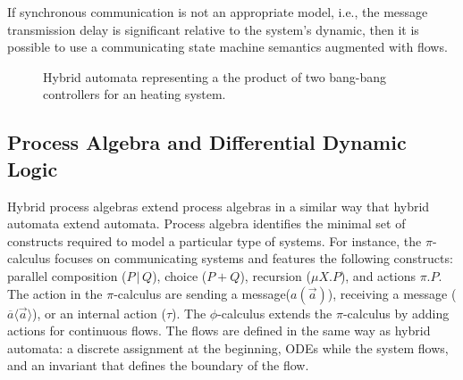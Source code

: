 \documentclass[
graybox,
envcountchap
]{svmult}
\begin{document}
\begin{bibunit}
If synchronous communication is not an appropriate model, i.e., the message transmission delay is significant relative to the system's dynamic, then it is possible to use a communicating state machine semantics \cite{DBLP:journals/jacm/BrandZ83} augmented with flows.

\begin{figure}
\centering
\resizebox{.8\linewidth}{!}{
    
}
\caption{
    Hybrid automata representing a the product of two bang-bang controllers for an heating system.
}
\label{fig:HA-ex2}
\end{figure}

    \subsection{Process Algebra and Differential Dynamic Logic}

Hybrid process algebras \cite{RoundsS03,BERGSTRA2005215,10.1007/978-3-319-53733-7_8,DBLP:conf/case/CampbellTLPOF16} extend process algebras in a similar way that hybrid automata extend automata.
Process algebra identifies the minimal set of constructs required to model a particular type of systems.
For instance, the $\pi$-calculus \cite{short:MilnerR:calmp1} focuses on communicating systems and features the following constructs:
  parallel composition ($P \,|\, Q$),
  choice ($P + Q$),
  recursion ($\mu X. P$), and
  actions $\pi.P$.
The action in the $\pi$-calculus are
  sending a message($a(\vec a)$),
  receiving a message ($\overline{a}\langle \vec a \rangle$), or
  an internal action ($\tau$). 
The $\phi$-calculus \cite{RoundsS03} extends the $\pi$-calculus by adding actions for continuous flows.
The flows are defined in the same way as hybrid automata:
  a discrete assignment at the beginning,
  ODEs while the system flows, and
  an invariant that defines the boundary of the flow.


\end{bibunit}
\end{document}

